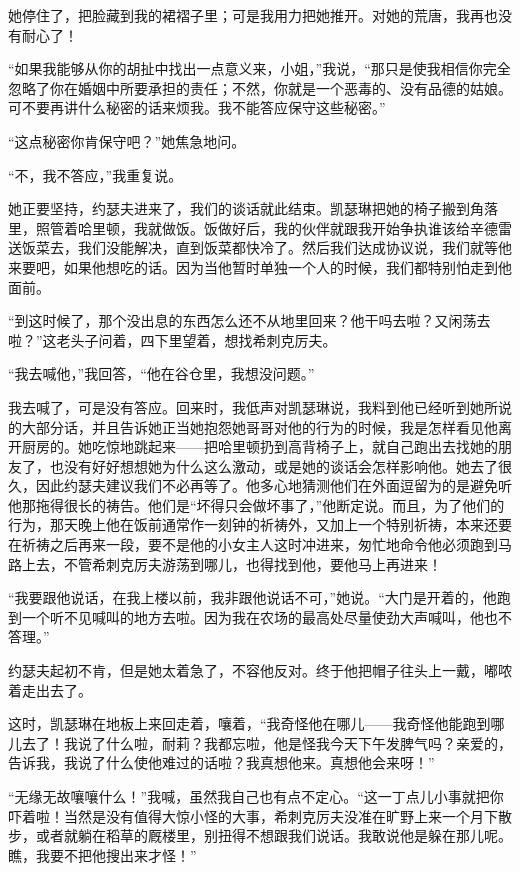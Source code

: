 \par 她停住了，把脸藏到我的裙褶子里；可是我用力把她推开。对她的荒唐，我再也没有耐心了！
\par “如果我能够从你的胡扯中找出一点意义来，小姐，”我说，“那只是使我相信你完全忽略了你在婚姻中所要承担的责任；不然，你就是一个恶毒的、没有品德的姑娘。可不要再讲什么秘密的话来烦我。我不能答应保守这些秘密。”
\par “这点秘密你肯保守吧？”她焦急地问。
\par “不，我不答应，”我重复说。
\par 她正要坚持，约瑟夫进来了，我们的谈话就此结束。凯瑟琳把她的椅子搬到角落里，照管着哈里顿，我就做饭。饭做好后，我的伙伴就跟我开始争执谁该给辛德雷送饭菜去，我们没能解决，直到饭菜都快冷了。然后我们达成协议说，我们就等他来要吧，如果他想吃的话。因为当他暂时单独一个人的时候，我们都特别怕走到他面前。
\par “到这时候了，那个没出息的东西怎么还不从地里回来？他干吗去啦？又闲荡去啦？”这老头子问着，四下里望着，想找希刺克厉夫。
\par “我去喊他，”我回答，“他在谷仓里，我想没问题。”
\par 我去喊了，可是没有答应。回来时，我低声对凯瑟琳说，我料到他已经听到她所说的大部分话，并且告诉她正当她抱怨她哥哥对他的行为的时候，我是怎样看见他离开厨房的。她吃惊地跳起来——把哈里顿扔到高背椅子上，就自己跑出去找她的朋友了，也没有好好想想她为什么这么激动，或是她的谈话会怎样影响他。她去了很久，因此约瑟夫建议我们不必再等了。他多心地猜测他们在外面逗留为的是避免听他那拖得很长的祷告。他们是“坏得只会做坏事了，”他断定说。而且，为了他们的行为，那天晚上他在饭前通常作一刻钟的祈祷外，又加上一个特别祈祷，本来还要在祈祷之后再来一段，要不是他的小女主人这时冲进来，匆忙地命令他必须跑到马路上去，不管希刺克厉夫游荡到哪儿，也得找到他，要他马上再进来！
\par “我要跟他说话，在我上楼以前，我非跟他说话不可，”她说。“大门是开着的，他跑到一个听不见喊叫的地方去啦。因为我在农场的最高处尽量使劲大声喊叫，他也不答理。”
\par 约瑟夫起初不肯，但是她太着急了，不容他反对。终于他把帽子往头上一戴，嘟哝着走出去了。
\par 这时，凯瑟琳在地板上来回走着，嚷着，“我奇怪他在哪儿——我奇怪他能跑到哪儿去了！我说了什么啦，耐莉？我都忘啦，他是怪我今天下午发脾气吗？亲爱的，告诉我，我说了什么使他难过的话啦？我真想他来。真想他会来呀！”
\par “无缘无故嚷嚷什么！”我喊，虽然我自己也有点不定心。“这一丁点儿小事就把你吓着啦！当然是没有值得大惊小怪的大事，希刺克厉夫没准在旷野上来一个月下散步，或者就躺在稻草的厩楼里，别扭得不想跟我们说话。我敢说他是躲在那儿呢。瞧，我要不把他搜出来才怪！”
